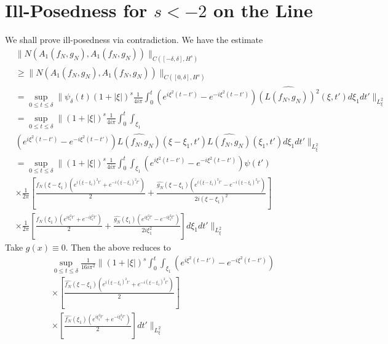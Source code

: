\documentclass[12pt,reqno]{amsart}
\numberwithin{equation}{section}  %
\newcommand{\wh}{\widehat}
\begin{document}
\section{Ill-Posedness for $s < -2$ on the Line} 
\label{realsec:ill-pos-line}
We shall prove ill-posedness via contradiction. We have the estimate
%
%
\begin{equation*}
\begin{split}
  & \| N(A_{1}(f_{N}, g_{N}), A_{1}(f_{N}, g_{N})) \|_{C([-\delta, \delta],
  H^{s})}
  \\
 & \ge
  \| N(A_{1}(f_{N}, g_{N}), A_{1}(f_{N}, g_{N})) \|_{C([0, \delta],
  H^{s})} 
  \\
  & = \sup_{0 \le t \le \delta} \| \psi_{\delta}(t) (1 + | \xi |)^{s}
  \frac{1}{4 i \pi} \int_{0}^{t} \left( e^{i\xi^{2}(t-t')} - e^{-i\xi^{2}(t-t')} \right)
  \wh{(L(f_{N},g_{N}))^{2}}(\xi, t') d \xi_{1} dt' \|_{L^{2}_{\xi}}
  \\
  & = \sup_{0 \le t \le \delta} \| (1 + | \xi |)^{s} \frac{1}{4 i \pi} 
  \int_{0}^{t} \int_{\xi_{1}}
  \\
  & \left( e^{i\xi^{2}(t-t')} - e^{-i\xi^{2}(t-t')} \right)
  \wh{L(f_{N},g_{N})}(\xi - \xi_{1}, t')\wh{L(f_{N},g_{N})}(\xi_{1}, t') d
  \xi_{1} dt'
  \|_{L^{2}_{\xi}}
  \\
  & = \sup_{0 \le t \le \delta} \| (1 + | \xi |)^{s} \frac{1}{4 i \pi} 
  \int_{0}^{t} \int_{\xi_{1}} \left( e^{i\xi^{2}(t-t')} - e^{-i\xi^{2}(t-t')} \right)
  \psi(t')
  \\
  & \times \frac{1}{2 \pi} \left[ \frac{\wh{f_{N}}(\xi - \xi_{1})\left( e^{i(\xi - \xi_{1})^{2}t'} +
  e^{-i(\xi - \xi_{1})^{2}t'} \right)}{2} + \frac{\wh{g_{N}}(\xi - \xi_{1})\left(
  e^{i(\xi - \xi_{1})^{2}t'} - e^{-i(\xi - \xi_{1})^{2}t'}
  \right)}{2i(\xi - \xi_{1})^{2}} \right]
  \\
  & \times \frac{1}{2 \pi} \left[ \frac{\wh{f_{N}}(\xi_{1})\left( e^{i\xi_{1}^{2}t'} +
  e^{-i\xi_{1}^{2}t'} \right)}{2} + \frac{\wh{g_{N}}(\xi_{1})\left(
  e^{i\xi_{1}^{2}t'} - e^{-i\xi_{1}^{2}t'}
  \right)}{2 i \xi_{1}^{2}} \right] d \xi_{1} dt' \|_{L^{2}_{\xi}}
\end{split}
\end{equation*}
%
Take $g(x) \equiv 0$. Then the above reduces to
%
%
\begin{equation*}
\begin{split}
  & \sup_{0 \le t \le \delta} \frac{1}{16 i \pi^{2}}\| (1 + | \xi |)^{s}
  \int_{0}^{t} \int_{\xi_{1}} \left( e^{i\xi^{2}(t-t')} - e^{-i\xi^{2}(t-t')} \right)
  \\
  & \times \left[ \frac{\wh{f_{N}}(\xi - \xi_{1})\left( e^{i(\xi - \xi_{1})^{2}t'} +
  e^{-i(\xi - \xi_{1})^{2}t'} \right)}{2} \right ]
  \\
  & \times \left[ \frac{\wh{f_{N}}(\xi_{1})\left( e^{i\xi_{1}^{2}t'} +
  e^{-i\xi_{1}^{2}t'} \right)}{2}  \right]
  dt' \|_{L^{2}_{\xi}}
\end{split}
\end{equation*}
\end{document}

